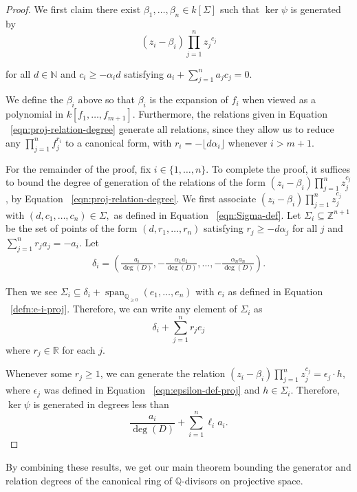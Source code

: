 \documentclass{amsart}
\theoremstyle{plain}
\theoremstyle{definition}
\theoremstyle{remark}
\numberwithin{equation}{section}
\newcommand\bq{{\mathbb Q}}
\newcommand\bida{a}
\DeclareMathOperator{\newspan}{span}
\begin{document}
\begin{proof}
We first claim there exist $\beta_1, \ldots, \beta_n \in k[\Sigma]$
such that $\ker \psi$ is generated by
\begin{equation}
\label{eqn:relations-psi-proj}
	(z_i - \beta_i)\prod_{j=1}^n {z_j}^{c_{j}}
\end{equation}

\noindent
for all $d \in \mathbb{N}$ and $c_i \ge -\alpha_i d$ satisfying
$\bida_i + \sum_{j = 1}^n \bida_j c_j = 0$.

We define the $\beta_i$ above so that $\beta_i$ is the expansion of
$f_i$ when viewed as a polynomial in $k[f_1,\ldots, f_{m + 1}]$.
Furthermore, the relations given in Equation
~\eqref{eqn:proj-relation-degree} generate all relations, since they
allow us to reduce any $ \prod_{j = 1}^n f_j^{r_i}$ to a canonical
form, with $r_i = -\lfloor  d \alpha_i\rfloor$ whenever $i  > m + 1$.

For the remainder of the proof, fix $i \in \{1,\ldots, n\}$. To
complete the proof, it suffices to bound the degree of generation
of the relations of the form $(z_i - \beta_i) \prod_{j = 1}^n
z_j^{c_j}$, by Equation ~\eqref{eqn:proj-relation-degree}. We first
associate $(z_i - \beta_i)\prod_{j=1}^n z_j^{c_j}$ with $(d, c_1,
\ldots, c_n) \in \Sigma,$ as defined in Equation
~\eqref{eqn:Sigma-def}. Let $\Sigma_i \subseteq \mathbb{Z}^{n + 1}$
be the set of points of the form $(d, r_1, \ldots, r_n)$ satisfying
$r_j \ge -d \alpha_j$ for all $j$ and $\sum_{j=1}^n r_j a_j = -a_i$.
Let
\begin{align*}
	\delta_i = \left(\frac{a_i}{\deg(D)}, -\frac{\alpha_1 a_1}{\deg(D)},
	\ldots, - \frac{\alpha_n a_n}{\deg(D)} \right).
\end{align*}

\noindent
Then we see $\Sigma_i \subseteq \delta_i + \newspan_{\bq_{\geq 0}}
(e_1, \ldots, e_n)$ with $e_i$ as defined in Equation
~\ref{defn:e-i-proj}. Therefore, we can write any element of
$\Sigma_i$ as
\[
	\delta_i + \sum_{j=1}^n r_j e_j
\]
where $r_j \in \mathbb{R}$ for each $j$.

Whenever some $r_j \ge 1$, we can generate the relation $(z_i -
\beta_i)\prod_{j=1}^n z_j^{c_j} = \epsilon_j \cdot h,$ where
$\epsilon_j$ was defined in Equation ~\ref{eqn:epsilon-def-proj} and
$h \in \Sigma_i$. Therefore, $\ker \psi$ is generated in degrees
less than
\[
	\frac{\bida_i}{\deg(D)} + \sum_{i=1}^n \ell_i a_i.
\]
\end{proof}

By combining these results, we get our main theorem bounding
the generator and relation degrees of the canonical ring of
$\bq$-divisors on projective space.
\end{document}
